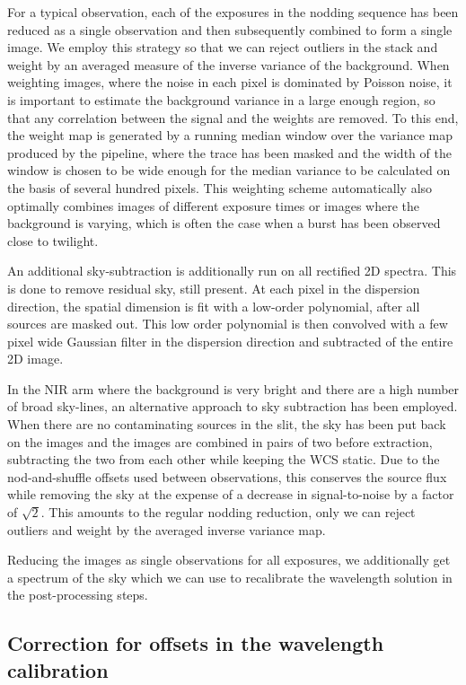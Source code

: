 \documentclass{aa}    %
\begin{document}
For a typical observation, each of the exposures in the nodding sequence has
been reduced as a single observation and then subsequently combined to form a
single image. We employ this strategy so that we can reject outliers in the
stack and weight by an averaged measure of the inverse variance of the
background. When weighting images, where the noise in each pixel is dominated by
Poisson noise, it is important to estimate the background variance in a large
enough region, so that any correlation between the signal and the weights are
removed. To this end, the weight map is generated by a running median window
over the variance map produced by the pipeline, where the trace has been masked
and the width of the window is chosen to be wide enough for the median variance to
be calculated on the basis of several hundred pixels. This weighting scheme
automatically also optimally combines images of different exposure times or
images where the background is varying, which is often the case when a burst has
been observed close to twilight.

An additional sky-subtraction is additionally run on all rectified 2D spectra.
This is done to remove residual sky, still present. At each pixel in the
dispersion direction, the spatial dimension is fit with a low-order polynomial,
after all sources are masked out. This low order polynomial is then convolved
with a few pixel wide Gaussian filter in the dispersion direction and subtracted
of the entire 2D image.

In the NIR arm where the background is very bright and there are a high number
of broad sky-lines, an alternative approach to sky subtraction has been
employed. When there are no contaminating sources in the slit, the sky has been
put back on the images and the images are combined in pairs of two before
extraction, subtracting the two from each other while keeping the WCS static.
Due to the nod-and-shuffle offsets used between observations, this conserves the
source flux while removing the sky at the expense of a decrease in
signal-to-noise by a factor of $\sqrt{2}$. This amounts to the regular nodding
reduction, only we can reject outliers and weight by the averaged inverse
variance map.

Reducing the images as single observations for all exposures, we additionally
get a spectrum of the sky which we can use to recalibrate the wavelength
solution in the post-processing steps.


\subsection{Correction for offsets in the wavelength calibration}    \label{wavecal}
\end{document}
